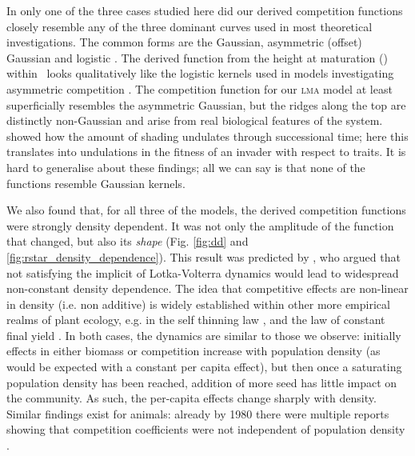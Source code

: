\documentclass[a4paper,11pt]{article}
\begin{document}
In only one of the three cases studied here did our derived
competition functions closely resemble any of the three dominant
curves used in most theoretical investigations. The common forms are
the Gaussian, asymmetric (offset) Gaussian \citep{Roughgarden-1979}
and logistic \citep[e.g.][]{Kisdi-1999, Law-1997}.  The derived
function from the height at maturation (\hmat) within \plant\ looks
qualitatively like the logistic kernels used in models investigating
asymmetric competition \citep{Law-1997, Geritz-1999, Kisdi-1999,
  Calcagno-2006}. The competition function for our \textsc{lma} model
at least superficially resembles the asymmetric Gaussian, but the
ridges along the top are distinctly non-Gaussian and arise from real
biological features of the system.
%
\citet{Falster-2011} showed how the amount of shading undulates
through successional time; here this translates into undulations in
the fitness of an invader with respect to traits. 
%
It is hard to generalise about these findings; all we can say is that
none of the functions resemble Gaussian kernels.

We also found that, for all three of the models, the derived
competition functions were strongly density dependent. It was not only
the amplitude of the function that changed, but also its \emph{shape}
(Fig. \ref{fig:dd} and \ref{fig:rstar_density_dependence}).
%
This result was predicted by \citet{Abrams-1980}, who argued that not
satisfying the implicit of Lotka-Volterra dynamics would lead to
widespread non-constant density dependence. The idea that competitive
effects are non-linear in density (i.e. non additive) is widely
established within other more empirical realms of plant ecology, e.g.
in the self thinning law \citep{Westoby-1984}, and the law of constant
final yield \citep{Weiner-2010}.
In both cases, the dynamics are similar to those we observe: initially
effects in either biomass or competition increase with population
density (as would be expected with a constant per capita effect), but
then once a saturating population density has been reached, addition
of more seed has little impact on the community. As such, the
per-capita effects change sharply with density. Similar findings exist
for animals: already by 1980 there were multiple reports showing that
competition coefficients were not independent of population density
\citep{Abrams-1980}.
\end{document}
